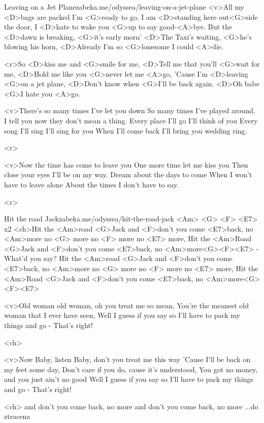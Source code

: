 \begin{song}{54}{Leaving on a Jet Plane}{zabeka.me/odyssea/leaving-on-a-jet-plane}
	<v>All my <D>bags are packed I'm <G>ready to go,
	I am <D>standing here out<G>side the door,
	I <D>hate to wake you <G>up to say good-<A>bye.
	But the <D>dawn is breaking, <G>it's early morn'
	<D>The Taxi's waiting, <G>he's blowing his horn,
	<D>Already I'm so <G>lonesome I could <A>die.

	<r>So <D>kiss me and <G>smile for me,
	<D>Tell me that you'll <G>wait for me,
	<D>Hold me like you <G>never let me <A>go,
	'Cause I'm <D>leaving <G>on a jet plane,
	<D>Don't know when <G>I'll be back again.
	<D>Oh babe <G>I hate you <A>go.

	<v>There's so many times I've let you down
	So many times I've played around,
	I tell you now they don't mean a thing.
	Every place I'll go I'll think of you
	Every song I'll sing I'll sing for you
	When I'll come back I'll bring you wedding ring.

	<r>

	<v>Now the time has come to leave you
	One more time let me kiss you
	Then close your eyes I'll be on my way.
	Dream about the days to come
	When I won't have to leave alone
	About the times I don't have to say.

	<r>
\end{song}
\begin{song}{55}{Hit the road Jack}{zabeka.me/odyssea/hit-the-road-jack}
	<Am> <G> <F> <E7> x2
	<ch>Hit the <Am>road <G>Jack and <F>don't you come <E7>back,
	no <Am>more no <G> more no <F> more no <E7> more,
	Hit the <Am>Road <G>Jack and <F>don't you come <E7>back,
	no <Am>more<G><F><E7> - What'd you say?
	Hit the <Am>road <G>Jack and <F>don't you come <E7>back,
	no <Am>more no <G> more no <F> more no <E7> more,
	Hit the <Am>Road <G>Jack and <F>don't you come <E7>back,
	no <Am>more<G><F><E7>

	<v>Old woman old woman, oh you treat me so mean,
	You're the meanest old woman that I ever have seen,
	Well I guess if you say so
	I'll have to pack my things and go - That's right!

	<ch>

	<v>Now Baby, listen Baby, don't you treat me this way
	'Cause I'll be back on my feet some day,
	Don't care if you do, cause it's understood,
	You got no money, and you just ain't no good
	Well I guess if you say so
	I'll have to pack my things and go - That's right!

	<ch>
	and don't you come back, no more
	and don't you come back, no more ...do ztracena
\end{song}
